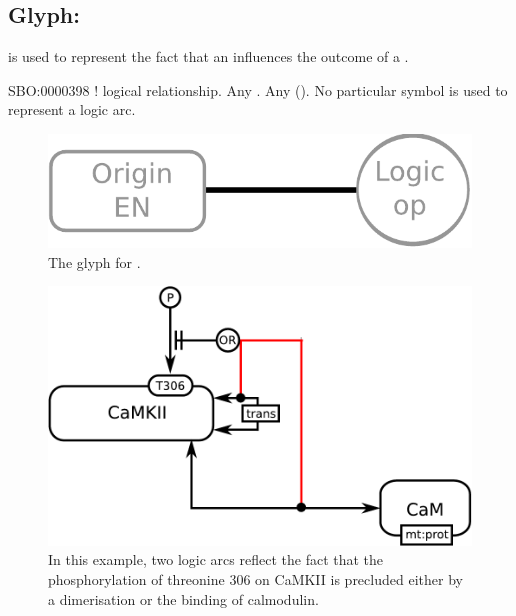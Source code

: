 \subsection{Glyph:  }\label{sec:logicArc}

 is used to represent the fact that an   influences
the outcome of a .

\begin{glyphDescription}
 \glyphSboTerm SBO:0000398 ! logical relationship.
 \glyphOrigin Any .
 \glyphTarget Any  ().
 \glyphEndPoint No particular symbol is used to represent a logic arc.
 \end{glyphDescription}

\begin{figure}[H]
  \centering
  \includegraphics[scale = 0.4]{images/logicArc}
  \caption{The \ER glyph for .}
  \label{fig:logicArc}
\end{figure}

\begin{figure}[H]
  \centering
  \includegraphics[scale = 0.5]{examples/ex-logicArc}
  \caption{In this example, two logic arcs reflect the fact that the phosphorylation of threonine 306 on CaMKII is precluded either by a dimerisation or the binding of calmodulin.}
  \label{fig:ex-logicArc}
\end{figure}

